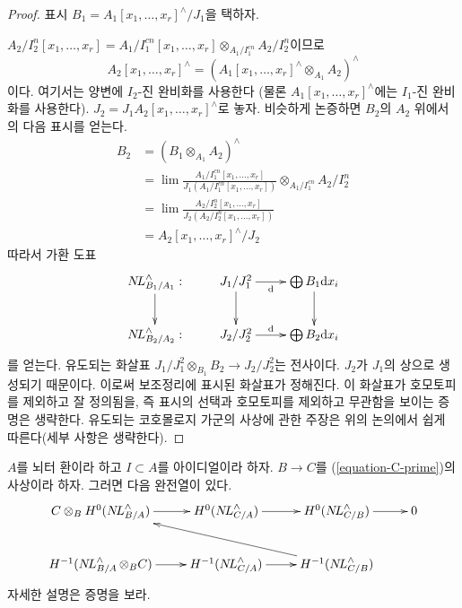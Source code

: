 \begin{proof}
표시 $B_1 = A_1[x_1, \ldots, x_r]^\wedge\allowbreak/J_1$을 택하자.

\noindent
$A_2/I_2^n[x_1, \ldots, x_r] \allowbreak=
A_1/I_1^{cn}[x_1, \ldots, x_r] \allowbreak\otimes_{A_1/I_1^{cn}}
A_2/I_2^n$이므로
$$
A_2[x_1, \ldots, x_r]^\wedge =
(A_1[x_1, \ldots, x_r]^\wedge \otimes_{A_1} A_2)^\wedge
$$
이다. 여기서는 양변에 $I_2$-진 완비화를 사용한다
(물론 $A_1[x_1, \ldots, x_r]^\wedge$에는 $I_1$-진 완비화를 사용한다).
$J_2 = J_1 A_2[x_1, \ldots, x_r]^\wedge$로 놓자.
비슷하게 논증하면 $B_2$의 $A_2$ 위에서의 다음 표시를 얻는다.
\begin{align*}
B_2
& =
(B_1 \otimes_{A_1} A_2)^\wedge \\
& =
\lim \frac{A_1/I_1^{cn}[x_1, \ldots, x_r]}{J_1(A_1/I_1^{cn}[x_1, \ldots, x_r])}
\otimes_{A_1/I_1^{cn}} A_2/I_2^n \\
& =
\lim \frac{A_2/I_2^n[x_1, \ldots, x_r]}{J_2(A_2/I_2^n[x_1, \ldots, x_r])} \\
& =
A_2[x_1, \ldots, x_r]^\wedge/J_2
\end{align*}
따라서 가환 도표
$$
\xymatrix{
\NL^\wedge_{B_1/A_1} : \ar[d] &
J_1/J_1^2 \ar[r]_-{\text{d}} \ar[d] & \bigoplus B_1\text{d}x_i \ar[d] \\
\NL^\wedge_{B_2/A_2} : &
J_2/J_2^2 \ar[r]^-{\text{d}} & \bigoplus B_2\text{d}x_i
}
$$
를 얻는다. 유도되는 화살표 $J_1/J_1^2 \otimes_{B_1} B_2 \to J_2/J_2^2$는 전사이다.
$J_2$가 $J_1$의 상으로 생성되기 때문이다.
이로써 보조정리에 표시된 화살표가 정해진다.
이 화살표가 호모토피를 제외하고 잘 정의됨을, 즉 표시의 선택과 호모토피를 제외하고
무관함을 보이는 증명은 생략한다.
유도되는 코호몰로지 가군의 사상에 관한 주장은 위의 논의에서 쉽게 따른다(세부 사항은 생략한다).
\end{proof}

\begin{lemma}
\label{lemma-exact-sequence-NL}
$A$를 뇌터 환이라 하고 $I \subset A$를 아이디얼이라 하자.
$B \to C$를 (\ref{equation-C-prime})의 사상이라 하자. 그러면 다음 완전열이 있다.
$$
\xymatrix{
C \otimes_B H^0(\NL_{B/A}^\wedge) \ar[r] &
H^0(\NL_{C/A}^\wedge) \ar[r] &
H^0(\NL_{C/B}^\wedge) \ar[r] & 0 \\
H^{-1}(\NL_{B/A}^\wedge \otimes_B C) \ar[r] &
H^{-1}(\NL_{C/A}^\wedge) \ar[r] &
H^{-1}(\NL_{C/B}^\wedge) \ar[llu]
}
$$
자세한 설명은 증명을 보라.
\end{lemma}

